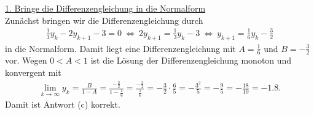 \underline{1. Bringe die Differenzengleichung in die Normalform}\\
Zunächst bringen wir die Differenzengleichung durch
\begin{align*}
	\frac{1}{3} y_k
	-
	2 y_{k+1}
	-3
	=0
	\ \Leftrightarrow \
	2 y_{k+1} 
	= 
	\frac{1}{3} y_k
	-3
	\ \Leftrightarrow \
	 y_{k+1} 
	= 
	\frac{1}{6} y_k
	-\frac{3}{2}
\end{align*}
in die Normalform. Damit liegt eine Differenzengleichung mit $A = \frac{1}{6}$ und $B = - \frac{3}{2}$ vor.
Wegen $0 < A < 1$ ist die Lösung der Differenzengleichung monoton und konvergent mit
\begin{align*}
	\lim \limits_{k \to \infty}
	y_k
	= 
	\frac{B}{1 -A} 
	=
	\frac{- \frac{3}{2}}{1 - \frac{1}{6}}
	=
	\frac{-\frac{3}{2}}{\frac{5}{6}}
	=
	- \frac{3}{2} \cdot \frac{6}{5}
	= 
	- \frac{3^2}{5}
	= 
	- \frac{9}{5} = - \frac{18}{10} =- 1.8.
\end{align*}
Damit ist Antwort (c) korrekt.